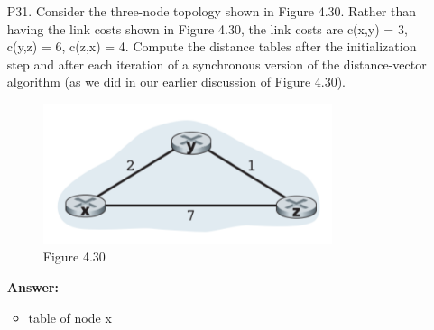 \begin{enumerate}
    \item[P31.] Consider the three-node topology shown in Figure 4.30. Rather than having the link costs shown in Figure 4.30, the link costs are c(x,y) = 3, c(y,z) = 6, c(z,x) = 4. Compute the distance tables after the initialization step and after each iteration of a synchronous version of the distance-vector algorithm (as we did in our earlier discussion of Figure 4.30).

    \begin{figure}[H]
        \centering
        \includegraphics[width=0.8\textwidth]{4th/4-30.png}
        \caption{Figure 4.30}
        \label{fig:4_30}
    \end{figure}

    \textbf{Answer:}

    \begin{itemize}
        \item table of node x
        \begin{table}[H]
            \centering
            \qquad
        \end{table}


\end{itemize}
\end{enumerate}
